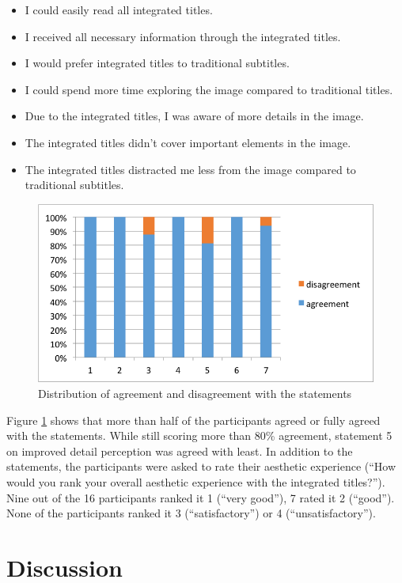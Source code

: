\documentclass[output=paper]{langsci/langscibook}
\begin{document}
\begin{itemize}
\item I could easily read all integrated titles.
\item I received all necessary information through the integrated titles.
\item I would prefer integrated titles to traditional subtitles.
\item I could spend more time exploring the image compared to traditional titles.
\item Due to the integrated titles, I was aware of more details in the image.
\item The integrated titles didn’t cover important elements in the image.
\item The integrated titles distracted me less from the image compared to traditional subtitles.
\end{itemize}

\begin{figure}
 \includegraphics[width=\textwidth]{figures/Fox11.png}
 \caption{Distribution of agreement and disagreement with the statements}
 \label{fox:fig:11}
\end{figure} 




Figure \ref{fox:fig:11} shows that more than half of the participants agreed or fully agreed with the statements. While still scoring more than 80\% agreement, statement 5 on improved detail perception was agreed with least. In addition to the statements, the participants were asked to rate their aesthetic experience (“How would you rank your overall aesthetic experience with the integrated titles?”). Nine out of the 16 participants ranked it 1 (“very good”), 7 rated it 2 (“good”). None of the participants ranked it 3 (“satisfactory”) or 4 (“unsatisfactory”).


\section{Discussion}
\end{document}
